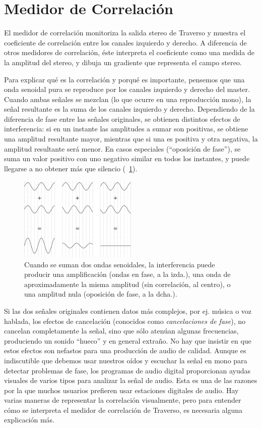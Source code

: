 ﻿\section{Medidor de Correlación}
El medidor de correlación monitoriza la salida stereo de Traverso y muestra el coeficiente de correlación entre los canales izquierdo y derecho. A diferencia de otros medidores de correlación, éste interpreta el coeficiente como una medida de la amplitud del stereo, y dibuja un gradiente que representa el campo stereo.

Para explicar qué es la correlación y porqué es importante, pensemos que una onda senoidal pura se reproduce por los canales izquierdo y derecho del master. Cuando ambas señales se mezclan (lo que ocurre en una reproducción mono), la señal resultante es la suma de los canales izquierdo y derecho. Dependiendo de la diferencia de fase entre las señales originales, se obtienen distintos efectos de interferencia: si en un instante las amplitudes a sumar son positivas, se obtiene una amplitud resultante mayor, mientras que si una es positiva y otra negativa, la amplitud resultante será menor. En casos especiales (``oposición de fase''), se suma un valor positivo con uno negativo similar en todos los instantes, y puede llegarse a no obtener más que silencio (\FigB\ \ref{fig_interference}).

\begin{figure}
	\centering\includegraphics[width=0.5\textwidth]{../images/sine01}
	\caption{Cuando se suman dos ondas senoidales, la interferencia puede producir una amplificación (ondas en fase, a la izda.), una onda de aproximadamente la misma amplitud (sin correlación, al centro), o una amplitud nula (oposición de fase, a la dcha.).}
	\label{fig_interference}
\end{figure}

Si las dos señales originales contienen datos más complejos, por ej. música o voz hablada, los efectos de cancelación (conocidos como \emph{cancelaciones de fase}), no cancelan completamente la señal, sino que sólo atenúan algunas frecuencias, produciendo un sonido ``hueco'' y en general extraño. No hay que insistir en que estos efectos son nefastos para una producción de audio de calidad. Aunque es indiscutible que debemos usar nuestros oídos y escuchar la señal en mono para detectar problemas de fase, los programas de audio digital proporcionan ayudas visuales de varios tipos para analizar la señal de audio. Esta es una de las razones por la que muchos usuarios prefieren usar estaciones digitales de audio. Hay varias maneras de representar la correlación visualmente, pero para entender cómo se interpreta el medidor de correlación de Traverso, es necesaria alguna explicación más.

